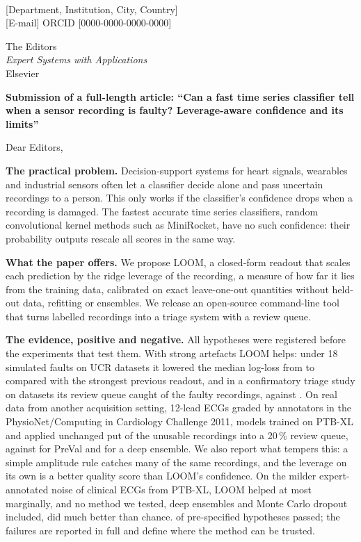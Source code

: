 \documentclass[11pt]{article}
\begin{document}
\\
{}[Department, Institution, City, Country]\\
{}[E-mail] \quad ORCID [0000-0000-0000-0000]

\noindent[Date]

\noindent The Editors\\
\emph{Expert Systems with Applications}\\
Elsevier

\textbf{Submission of a full-length article: ``Can a fast time series classifier tell when a sensor recording is faulty? Leverage-aware confidence and its limits''}

Dear Editors,

\textbf{The practical problem.} Decision-support systems for heart signals, wearables and industrial sensors often let a classifier decide alone and pass uncertain recordings to a person. This only works if the classifier's confidence drops when a recording is damaged. The fastest accurate time series classifiers, random convolutional kernel methods such as MiniRocket, have no such confidence: their probability outputs rescale all scores in the same way.

\textbf{What the paper offers.} We propose LOOM, a closed-form readout that scales each prediction by the ridge leverage of the recording, a measure of how far it lies from the training data, calibrated on exact leave-one-out quantities without held-out data, refitting or ensembles. We release an open-source command-line tool that turns labelled recordings into a triage system with a review queue.

\textbf{The evidence, positive and negative.} All hypotheses were registered before the experiments that test them. With strong artefacts LOOM helps: under 18 simulated faults on \NDatasets{} UCR datasets it lowered the median log-loss from \NLLFaultsPreVal{} to \NLLFaultsLoom{} compared with the strongest previous readout, and in a confirmatory triage study on \CNDatasets{} datasets its review queue caught \CCaughtLoom{} of the faulty recordings, against \CCaughtPreVal. On real data from another acquisition setting, \CincN{} 12-lead ECGs graded by annotators in the PhysioNet/Computing in Cardiology Challenge 2011, models trained on PTB-XL and applied unchanged put \CincHTwelveCaughtLoom{} of the unusable recordings into a 20\,\% review queue, against \CincHTwelveCaughtPreVal{} for PreVal and \CincCaughtDeepEns{} for a deep ensemble. We also report what tempers this: a simple amplitude rule catches many of the same recordings, and the leverage on its own is a better quality score than LOOM's confidence. On the milder expert-annotated noise of \PTBN{} clinical ECGs from PTB-XL, LOOM helped at most marginally, and no method we tested, deep ensembles and Monte Carlo dropout included, did much better than chance. \NHypPass{} of \NHyp{} pre-specified hypotheses passed; the failures are reported in full and define where the method can be trusted.
\end{document}
